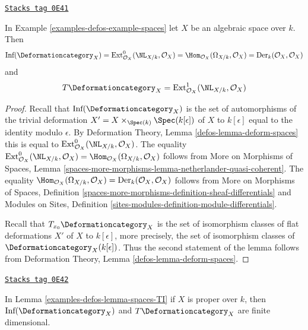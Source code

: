 \begin{lemma}[Spaces TI]
\label{examples-defos-lemma-spaces-TI}
\href{https://stacks.math.columbia.edu/tag/0E41}{\texttt{Stacks tag 0E41}}

In Example \ref{examples-defos-example-spaces} let $X$ be an algebraic space over $k$. Then
$$
\text{Inf}(\Deformationcategory_X) =
\text{Ext}^0_{\mathcal{O}_X}(\NL_{X/k}, \mathcal{O}_X) =
\Hom_{\mathcal{O}_X}(\Omega_{X/k}, \mathcal{O}_X) =
\text{Der}_k(\mathcal{O}_X, \mathcal{O}_X)
$$
and
$$
T\Deformationcategory_X =
\text{Ext}^1_{\mathcal{O}_X}(\NL_{X/k}, \mathcal{O}_X)
$$
\end{lemma}

\begin{proof}
Recall that $\text{Inf}(\Deformationcategory_X)$ is the set of
automorphisms of the trivial deformation
$X' = X \times_{\Spec(k)} \Spec(k[\epsilon])$ of $X$ to $k[\epsilon]$
equal to the identity modulo $\epsilon$.
By Deformation Theory, Lemma \ref{defos-lemma-deform-spaces}
this is equal to $\text{Ext}^0_{\mathcal{O}_X}(\NL_{X/k}, \mathcal{O}_X)$.
The equality $\text{Ext}^0_{\mathcal{O}_X}(\NL_{X/k}, \mathcal{O}_X) =
\Hom_{\mathcal{O}_X}(\Omega_{X/k}, \mathcal{O}_X)$ follows from
More on Morphisms of Spaces, Lemma
\ref{spaces-more-morphisms-lemma-netherlander-quasi-coherent}.
The equality
$\Hom_{\mathcal{O}_X}(\Omega_{X/k}, \mathcal{O}_X) =
\text{Der}_k(\mathcal{O}_X, \mathcal{O}_X)$
follows from More on Morphisms of Spaces, Definition
\ref{spaces-more-morphisms-definition-sheaf-differentials} and
Modules on Sites, Definition
\ref{sites-modules-definition-module-differentials}.

\medskip\noindent
Recall that $T_{x_0}\Deformationcategory_X$ is the set of isomorphism classes
of flat deformations $X'$ of $X$ to $k[\epsilon]$, more precisely,
the set of isomorphism classes of $\Deformationcategory_X(k[\epsilon])$.
Thus the second statement of the lemma follows from
Deformation Theory, Lemma \ref{defos-lemma-deform-spaces}.
\end{proof}

\begin{lemma}
\label{examples-defos-lemma-proper-spaces-TI}
\href{https://stacks.math.columbia.edu/tag/0E42}{\texttt{Stacks tag 0E42}}

In Lemma \ref{examples-defos-lemma-spaces-TI} if $X$ is proper over $k$, then
$\text{Inf}(\Deformationcategory_X)$ and $T\Deformationcategory_X$ are
finite dimensional.
\end{lemma}

